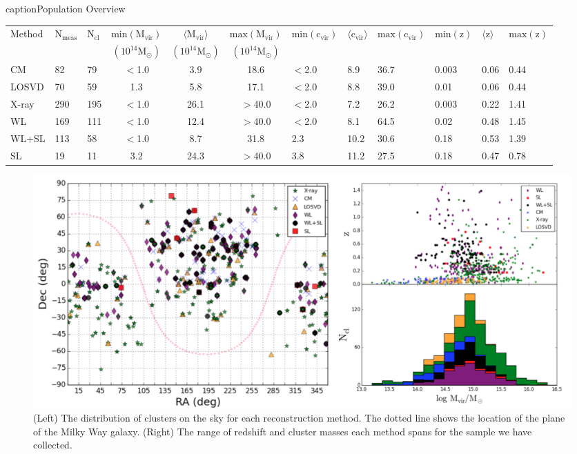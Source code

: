 \setcounter{table}{0}
\begin{landscape}
\begin{table}
caption{Population Overview}
\label{tab1}
\begin{tabular}{@{}lllcccllllll}
\hline
\hline
 Method &$\mathrm{N_{meas}}$&$\mathrm{N_{cl}}$&$\mathrm{min(M_{vir})}$
              &$\mathrm{\langle M_{vir} \rangle}$ 
 &$\mathrm{max(M_{vir})}$ &$\mathrm{min(c_{vir})}$&$\mathrm{\langle c_{vir} \rangle}$ 
 &$\mathrm{max(c_{vir})}$& $\mathrm{min(z)}$ & $\mathrm{\langle z
                                                     \rangle}$
                            &$\mathrm{max(z)}$\\ 
&&&$\mathrm{(10^{14}M_{\odot})}$&$\mathrm{(10^{14}M_{\odot})}$&$\mathrm{(10^{14}M_{\odot})}$&&&&&&\\
\hline
CM & 82 & 79 & $<$1.0 & 3.9 & 18.6 & $<$2.0& 8.9 &36.7 & 0.003& 0.06&0.44\\
LOSVD & 70 & 59 & 1.3& 5.8 & 17.1& $<$2.0& 8.8& 39.0& 0.01& 0.06&0.44\\
X-ray & 290& 195 & $<$1.0 & 26.1 & $>$40.0& $<$2.0& 7.2& 26.2& 0.003 & 0.22&1.41\\
WL & 169 & 111 & $<$1.0 & 12.4 & $>$40.0& $<$2.0& 8.1& 64.5& 0.02& 0.48 &1.45 \\
WL+SL & 113 & 58 & $<$1.0 & 8.7 & 31.8 & 2.3& 10.2& 30.6& 0.18& 0.53 &1.39\\
SL & 19 & 11 & 3.2& 24.3 & $>$40.0 & 3.8& 11.2& 27.5& 0.18& 0.47 &0.78\\
\hline
\hline
\end{tabular}
\end{table}
\end{landscape}

\begin{figure}
\begin{center}
\includegraphics[width=\textwidth]{./images/CMRelationProject/PopulationOverview1.pdf}
\end{center}
\caption[Cluster Population Overview]{(Left) The distribution of clusters on the sky for each reconstruction
  method. The dotted line shows the location of the plane of the Milky Way
  galaxy. (Right) The range of redshift and cluster masses each method spans
  for the sample we have collected.}
\end{figure}



